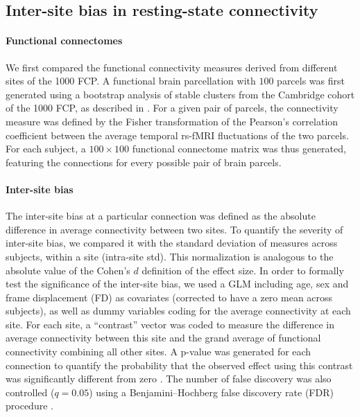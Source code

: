 \documentclass[authoryear]{elsarticle}
\begin{document}
\subsection{Inter-site bias in resting-state connectivity}
\paragraph{Functional connectomes} We first compared the functional connectivity measures derived from different sites of the 1000 FCP. A functional brain parcellation with $100$ parcels was first generated using a bootstrap analysis of stable clusters \citep{Bellec2010c} from the Cambridge cohort of the 1000 FCP, as described in \cite{Orban2015}. For a given pair of parcels, the connectivity measure was defined by the Fisher transformation of the Pearson's correlation coefficient between the average temporal rs-fMRI fluctuations of the two parcels. For each subject, a $100 \times 100$ functional connectome matrix was thus generated, featuring the connections for every possible pair of brain parcels. 

\paragraph{Inter-site bias} The inter-site bias at a particular connection was defined as the absolute difference in average connectivity between two sites. To quantify the severity of inter-site bias, we compared it with the standard deviation of measures across subjects, within a site (intra-site std). This normalization is analogous to the absolute value of the Cohen's $d$ definition of the effect size. In order to formally test the significance of the inter-site bias, we used a GLM including age, sex and frame displacement (FD) as covariates (corrected to have a zero mean across subjects), as well as dummy variables coding for the average connectivity at each site. For each site, a ``contrast'' vector was coded to measure the difference in average connectivity between this site and the grand average of functional connectivity combining all other sites. A p-value was generated for each connection to quantify the probability that the observed effect using this contrast was significantly different from zero \citep{Worsley1995}. The number of false discovery was also controlled ($q=0.05$) using a Benjamini–Hochberg false discovery rate (FDR) procedure \citep{Benjamini1995}.

\end{document}
